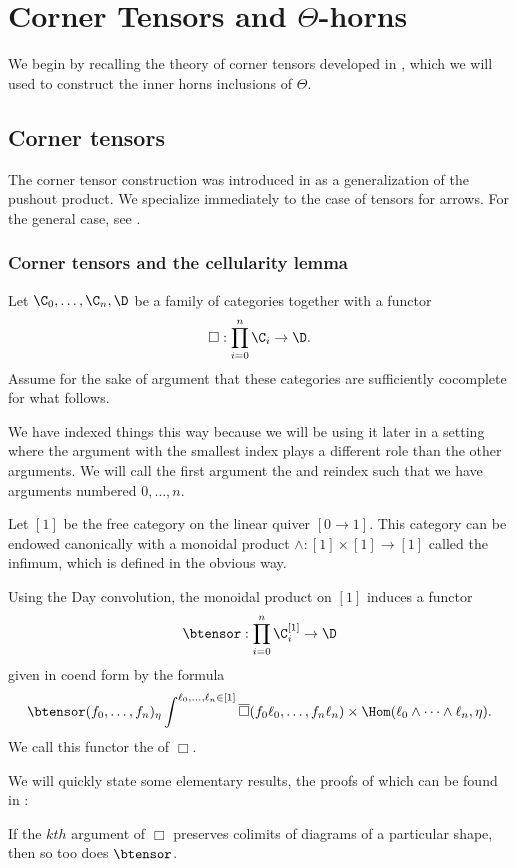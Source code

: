 \chapter{Corner Tensors and $\Theta$-horns}
We begin by recalling the theory of corner tensors developed in \cite{ourythesis}, which we will used to construct the inner horns inclusions of \(\Theta\).
\section{Corner tensors}
The corner tensor construction was introduced in \cite{ourythesis} as a generalization of the pushout product.  We specialize immediately to the case of tensors for arrows.  For the general case, see \cite{ourythesis}.

\subsection{Corner tensors and the cellularity lemma}
Let \(\C_0,\dots,\C_n,\D\) be a family of categories together with a functor \[\Box:\prod_{i=0}^n \C_i \to \D . \] Assume for the sake of argument that these categories are sufficiently cocomplete for what follows.

\begin{note} We have indexed things this way because we will be using it later in a setting where the argument with the smallest index plays a different role than the other arguments.  We will call the first argument the  and reindex such that we have arguments numbered \(0,\dots,n\).   
\end{note}

Let \([1]\) be the free category on the linear quiver \([0\to 1]\).  This category can be endowed canonically with a monoidal product \(\wedge:[1]\times [1]\to [1]\) called the infimum, which is defined in the obvious way.   

\begin{defn} Using the Day convolution, the monoidal product on \([1]\) induces a functor \[\btensor:\prod_{i=0}^n \C^{[1]}_i\to \D\] given in coend form by the formula \[\btensor(f_0,\dots, f_n)_{\eta}\int^{\ell_0,\dots,\ell_n \in [1]} \overline{\Box}(f_0 \ell_0,\dots, f_n\ell_n)\times \Hom(\ell_0\wedge \dots \wedge \ell_n,\eta).\] We call this functor the  of \(\Box\).  
\end{defn}

We will quickly state some elementary results, the proofs of which can be found in \cite{ourythesis}:
\begin{prop} If the \(kth\) argument of \(\Box\) preserves colimits of diagrams of a particular shape, then so too does \(\btensor\).  
\end{prop}

